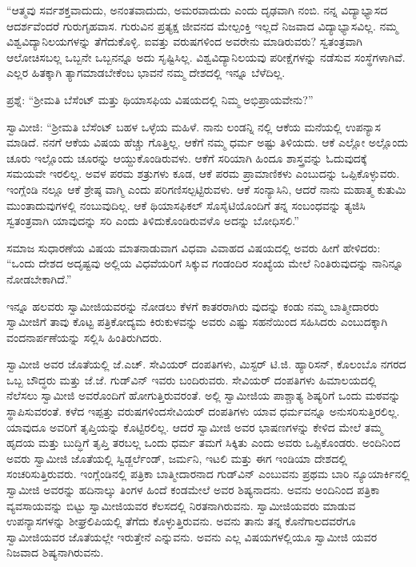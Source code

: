 “ಆತ್ಮವು ಸರ್ವಶಕ್ತವಾದುದು, ಅನಂತವಾದುದು, ಅಮರವಾದುದು ಎಂದು ದೃಢವಾಗಿ ನಂಬಿ. ನನ್ನ ವಿದ್ಯಾಭ್ಯಾಸದ ಆದರ್ಶವೆಂದರೆ ಗುರುಗೃಹವಾಸ. ಗುರುವಿನ ಪ್ರತ್ಯಕ್ಷ ಜೀವನದ ಮೇಲ್ಪಂಕ್ತಿ ಇಲ್ಲದೆ ನಿಜವಾದ ವಿದ್ಯಾಭ್ಯಾಸವಿಲ್ಲ. ನಮ್ಮ ವಿಶ್ವವಿದ್ಯಾನಿಲಯಗಳನ್ನು ತೆಗೆದುಕೊಳ್ಳಿ. ಐವತ್ತು ವರುಷಗಳಿಂದ ಅವರೇನು ಮಾಡಿರುವರು? ಸ್ವತಂತ್ರವಾಗಿ ಆಲೋಚಿಸಬಲ್ಲ ಒಬ್ಬನೇ ಒಬ್ಬನನ್ನೂ ಅದು ಸೃಷ್ಟಿಸಿಲ್ಲ. ವಿಶ್ವವಿದ್ಯಾನಿಲಯವು ಪರೀಕ್ಷೆಗಳನ್ನು ನಡೆಸುವ ಸಂಸ್ಥೆಗಳಾಗಿವೆ. ಎಲ್ಲರ ಹಿತಕ್ಕಾಗಿ ತ್ಯಾಗಮಾಡಬೇಕೆಂಬ ಭಾವನೆ ನಮ್ಮ ದೇಶದಲ್ಲಿ ಇನ್ನೂ ಬೆಳೆದಿಲ್ಲ.

ಪ್ರಶ್ನೆ: “ಶ‍್ರೀಮತಿ ಬೆಸೆಂಟ್​ ಮತ್ತು ಥಿಯಾಸಫಿಯ ವಿಷಯದಲ್ಲಿ ನಿಮ್ಮ ಅಭಿಪ್ರಾಯವೇನು?”

ಸ್ವಾಮೀಜಿ: “ಶ‍್ರೀಮತಿ ಬೆಸೆಂಟ್​ ಬಹಳ ಒಳ್ಳೆಯ ಮಹಿಳೆ. ನಾನು ಲಂಡನ್ನಿ ನಲ್ಲಿ ಆಕೆಯ ಮನೆಯಲ್ಲಿ ಉಪನ್ಯಾಸ ಮಾಡಿದೆ. ನನಗೆ ಆಕೆಯ ವಿಷಯ ಹೆಚ್ಚು ಗೊತ್ತಿಲ್ಲ. ಆಕೆಗೆ ನಮ್ಮ ಧರ್ಮ ಅಷ್ಟು ತಿಳಿಯದು. ಆಕೆ ಎಲ್ಲೋ ಅಲ್ಲೊಂದು ಚೂರು ಇಲ್ಲೊಂದು ಚೂರನ್ನು ಆಯ್ದುಕೊಂಡಿರುವಳು. ಆಕೆಗೆ ಸರಿಯಾಗಿ ಹಿಂದೂ ಶಾಸ್ತ್ರವನ್ನು ಓದುವುದಕ್ಕೆ ಸಮಯವೇ ಇರಲಿಲ್ಲ. ಅವಳ ಪರಮ ಶತ್ರುಗಳು ಕೂಡ, ಆಕೆ ಪರಮ ಪ್ರಾಮಾಣಿಕಳು ಎಂಬುದನ್ನು ಒಪ್ಪಿಕೊಳ್ಳುವರು. ಇಂಗ್ಲೆಂಡಿ ನಲ್ಲೂ ಆಕೆ ಶ್ರೇಷ್ಠ ವಾಗ್ಮಿ ಎಂದು ಪರಿಗಣಿಸಲ್ಪಟ್ಟಿರುವಳು. ಆಕೆ ಸಂನ್ಯಾಸಿನಿ, ಆದರೆ ನಾನು ಮಹಾತ್ಮ ಕುತುಮಿ ಮುಂತಾದುವುಗಳಲ್ಲಿ ನಂಬುವುದಿಲ್ಲ. ಆಕೆ ಥಿಯಾಸಫಿಕಲ್​ ಸೊಸೈಟಿಯೊಂದಿಗೆ ತನ್ನ ಸಂಬಂಧವನ್ನು ತ್ಯಜಿಸಿ ಸ್ವತಂತ್ರವಾಗಿ ಯಾವುದನ್ನು ಸರಿ ಎಂದು ತಿಳಿದುಕೊಂಡಿರುವಳೊ ಅದನ್ನು ಬೋಧಿಸಲಿ.”

ಸಮಾಜ ಸುಧಾರಣೆಯ ವಿಷಯ ಮಾತನಾಡುವಾಗ ವಿಧವಾ ವಿವಾಹದ ವಿಷಯದಲ್ಲಿ ಅವರು ಹೀಗೆ ಹೇಳಿದರು: “ಒಂದು ದೇಶದ ಅದೃಷ್ಟವು ಅಲ್ಲಿಯ ವಿಧವೆಯರಿಗೆ ಸಿಕ್ಕುವ ಗಂಡಂದಿರ ಸಂಖ್ಯೆಯ ಮೇಲೆ ನಿಂತಿರುವುದನ್ನು ನಾನಿನ್ನೂ ನೋಡಬೇಕಾಗಿದೆ.”

ಇನ್ನೂ ಹಲವರು ಸ್ವಾಮೀಜಿಯವರನ್ನು ನೋಡಲು ಕೆಳಗೆ ಕಾತರರಾಗಿರು ವುದನ್ನು ಕಂಡು ನಮ್ಮ ಬಾತ್ಮೀದಾರರು ಸ್ವಾಮೀಜಿಗೆ ತಾವು ಕೊಟ್ಟ ಪತ್ರಿಕೋದ್ಯಮ ಕಿರುಕುಳವನ್ನು ಅವರು ಎಷ್ಟು ಸಹನೆಯಿಂದ ಸಹಿಸಿದರು ಎಂಬುದಕ್ಕಾಗಿ ವಂದನಾರ್ಪಣೆಯನ್ನು ಸಲ್ಲಿಸಿ ಹಿಂತಿರುಗಿದರು.

ಸ್ವಾಮೀಜಿ ಅವರ ಜೊತೆಯಲ್ಲಿ ಜೆ.ಎಚ್​. ಸೇವಿಯರ್​ ದಂಪತಿಗಳು, ಮಿಸ್ಟರ್​ ಟಿ.ಜಿ. ಹ್ಯಾರಿಸನ್​, ಕೊಲಂಬೊ ನಗರದ ಒಬ್ಬ ಬೌದ್ಧರು ಮತ್ತು ಜೆ.ಜೆ. ಗುಡ್​ವಿನ್​ ಇವರು ಬಂದಿರುವರು. ಸೇವಿಯರ್​ ದಂಪತಿಗಳು ಹಿಮಾಲಯದಲ್ಲಿ ನೆಲೆಸಲು ಸ್ವಾಮೀಜಿ ಅವರೊಂದಿಗೆ ಹೋಗುತ್ತಿರುವರಂತೆ. ಅಲ್ಲಿ ಸ್ವಾಮೀಜಿಯ ಪಾಶ್ಚಾತ್ಯ ಶಿಷ್ಯರಿಗೆ ಒಂದು ಮಠವನ್ನು ಸ್ಥಾಪಿಸುವರಂತೆ. ಕಳೆದ ಇಪ್ಪತ್ತು ವರುಷಗಳಿಂದಸೇವಿಯರ್​ ದಂಪತಿಗಳು ಯಾವ ಧರ್ಮವನ್ನೂ ಅನುಸರಿಸುತ್ತಿರಲಿಲ್ಲ. ಯಾವುದೂ ಅವರಿಗೆ ತೃಪ್ತಿಯನ್ನು ಕೊಟ್ಟಿರಲಿಲ್ಲ. ಆದರೆ ಸ್ವಾಮೀಜಿ ಅವರ ಭಾಷಣಗಳನ್ನು ಕೇಳಿದ ಮೇಲೆ ತಮ್ಮ ಹೃದಯ ಮತ್ತು ಬುದ್ಧಿಗೆ ತೃಪ್ತಿ ತರಬಲ್ಲ ಒಂದು ಧರ್ಮ ತಮಗೆ ಸಿಕ್ಕಿತು ಎಂದು ಅವರು ಒಪ್ಪಿಕೊಂಡರು. ಅಂದಿನಿಂದ ಅವರು ಸ್ವಾಮೀಜಿ ಜೊತೆಯಲ್ಲಿ ಸ್ವಿಡ್ಜರ್ಲೆಂಡ್​, ಜರ್ಮನಿ, ಇಟಲಿ ಮತ್ತು ಈಗ ಇಂಡಿಯಾ ದೇಶದಲ್ಲಿ ಸಂಚರಿಸುತ್ತಿರುವರು. ಇಂಗ್ಲೆಂಡಿನಲ್ಲಿ ಪತ್ರಿಕಾ ಬಾತ್ಮೀದಾರನಾದ ಗುಡ್​ವಿನ್​ ಎಂಬುವನು ಪ್ರಥಮ ಬಾರಿ ನ್ಯೂಯಾರ್ಕಿನಲ್ಲಿ ಸ್ವಾಮೀಜಿ ಅವರನ್ನು ಹದಿನಾಲ್ಕು ತಿಂಗಳ ಹಿಂದೆ ಕಂಡಮೇಲೆ ಅವರ ಶಿಷ್ಯನಾದನು. ಅವನು ಅಂದಿನಿಂದ ಪತ್ರಿಕಾ ವ್ಯವಸಾಯವನ್ನು ಬಿಟ್ಟು ಸ್ವಾಮೀಜಿಯವರ ಕೆಲಸದಲ್ಲಿ ನಿರತನಾಗಿರುವನು. ಸ್ವಾಮೀಜಿಯವರು ಮಾಡುವ ಉಪನ್ಯಾಸಗಳನ್ನು ಶೀಘ್ರಲಿಪಿಯಲ್ಲಿ ತೆಗೆದು ಕೊಳ್ಳುತ್ತಿರುವನು. ಅವನು ತಾನು ತನ್ನ ಕೊನೆಗಾಲದವರೆಗೂ ಸ್ವಾಮೀಜಿಯವರ ಜೊತೆಯಲ್ಲೇ ಇರುತ್ತೇನೆ ಎನ್ನುವನು. ಅವನು ಎಲ್ಲ ವಿಷಯಗಳಲ್ಲಿಯೂ ಸ್ವಾಮೀಜಿ ಯವರ ನಿಜವಾದ ಶಿಷ್ಯನಾಗಿರುವನು.

